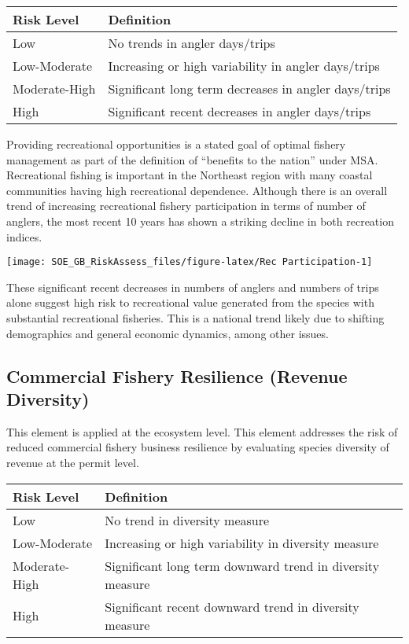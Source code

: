 \documentclass[11pt,]{article}
\let\origfigure\figure
\let\endorigfigure\endfigure
\renewenvironment{figure}[1][2] {
    \expandafter\origfigure\expandafter[H]
} {
    \endorigfigure
}
\begin{document}
\begin{longtable}[]{@{}ll@{}}
\toprule
Risk Level & Definition\tabularnewline
\midrule
\endhead
Low & No trends in angler days/trips\tabularnewline
Low-Moderate & Increasing or high variability in angler
days/trips\tabularnewline
Moderate-High & Significant long term decreases in angler
days/trips\tabularnewline
High & Significant recent decreases in angler days/trips\tabularnewline
\bottomrule
\end{longtable}

Providing recreational opportunities is a stated goal of optimal fishery
management as part of the definition of ``benefits to the nation'' under
MSA. Recreational fishing is important in the Northeast region with many
coastal communities having high recreational dependence. Although there
is an overall trend of increasing recreational fishery participation in
terms of number of anglers, the most recent 10 years has shown a
striking decline in both recreation indices.

\begin{figure}

{\centering \texttt{[image: SOE\_GB\_RiskAssess\_files/figure-latex/Rec Participation-1]} 

}

\caption{A: number of anglers, B: number of trips \label{recreation}}\label{fig:Rec Participation}
\end{figure}

These significant recent decreases in numbers of anglers and numbers of
trips alone suggest high risk to recreational value generated from the
species with substantial recreational fisheries. This is a national
trend likely due to shifting demographics and general economic dynamics,
among other issues.

\subsection{Commercial Fishery Resilience (Revenue
Diversity)}\label{commercial-fishery-resilience-revenue-diversity}

This element is applied at the ecosystem level. This element addresses
the risk of reduced commercial fishery business resilience by evaluating
species diversity of revenue at the permit level.

\begin{longtable}[]{@{}ll@{}}
\toprule
Risk Level & Definition\tabularnewline
\midrule
\endhead
Low & No trend in diversity measure\tabularnewline
Low-Moderate & Increasing or high variability in diversity
measure\tabularnewline
Moderate-High & Significant long term downward trend in diversity
measure\tabularnewline
High & Significant recent downward trend in diversity
measure\tabularnewline
\bottomrule
\end{longtable}
\end{document}
